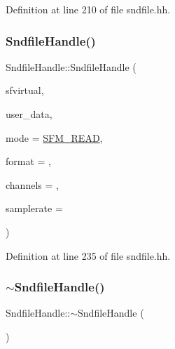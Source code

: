 Definition at line 210 of file sndfile.\+hh.

\mbox{\label{class_sndfile_handle_a4c0aa4c1c1403c8ee28287a40eda0ddc}} 
\subsubsection{\texorpdfstring{SndfileHandle()}{SndfileHandle()}\hspace{0.1cm}{\footnotesize\ttfamily [5/6]}}
{\footnotesize\ttfamily Sndfile\+Handle\+::\+Sndfile\+Handle (\begin{DoxyParamCaption}\item[{\mbox{\hyperlink{struct_s_f___v_i_r_t_u_a_l___i_o}{S\+F\+\_\+\+V\+I\+R\+T\+U\+A\+L\+\_\+\+IO}} \&}]{sfvirtual,  }\item[{void $\ast$}]{user\+\_\+data,  }\item[{int}]{mode = {\ttfamily \mbox{\hyperlink{sndfile_8h_adc29c2ff13d900c2f185ee95427fb06ca125531fe9c895237bccd35736370e815}{S\+F\+M\+\_\+\+R\+E\+AD}}},  }\item[{int}]{format = {},  }\item[{int}]{channels = {},  }\item[{int}]{samplerate = {} }\end{DoxyParamCaption})\hspace{0.3cm}{\ttfamily [inline]}}



Definition at line 235 of file sndfile.\+hh.

\mbox{\label{class_sndfile_handle_a64618c3e3c7537b621a9a00b4db18168}} 
\subsubsection{\texorpdfstring{$\sim$SndfileHandle()}{~SndfileHandle()}}
{\footnotesize\ttfamily Sndfile\+Handle\+::$\sim$\+Sndfile\+Handle (\begin{DoxyParamCaption}\item[{void}]{ }\end{DoxyParamCaption})\hspace{0.3cm}{\ttfamily [inline]}}



